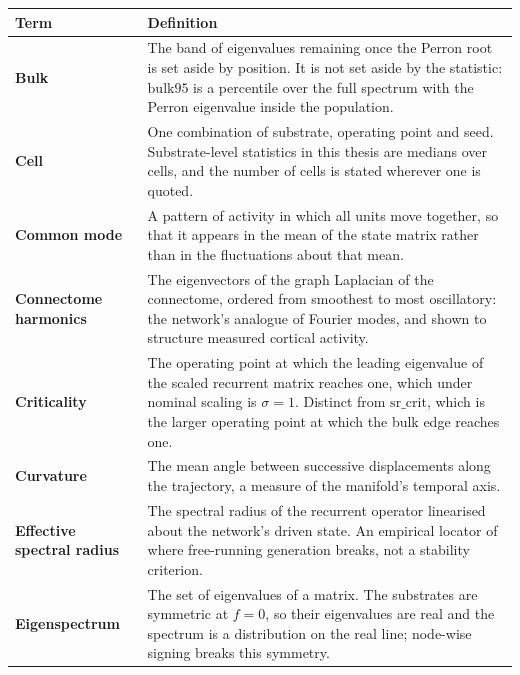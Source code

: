 \begin{longtable}{>{\raggedright\arraybackslash}p{3.4cm}p{\dimexpr\linewidth-3.4cm-4\tabcolsep\relax}}
    \toprule
    Term & Definition \\
    \midrule\endhead %

    \textbf{Bulk} & The band of eigenvalues remaining once the Perron root is set aside by position. It is not set aside by the statistic: $\mathrm{bulk95}$ is a percentile over the full spectrum with the Perron eigenvalue inside the population. \\

    \textbf{Cell} & One combination of substrate, operating point and seed. Substrate-level statistics in this thesis are medians over cells, and the number of cells is stated wherever one is quoted. \\

    \textbf{Common mode} & A pattern of activity in which all units move together, so that it appears in the mean of the state matrix rather than in the fluctuations about that mean. \\

    \textbf{Connectome harmonics} & The eigenvectors of the graph Laplacian of the connectome, ordered from smoothest to most oscillatory: the network's analogue of Fourier modes, and shown to structure measured cortical activity. \\

    \textbf{Criticality} & The operating point at which the leading eigenvalue of the scaled recurrent matrix reaches one, which under nominal scaling is $\sigma = 1$. Distinct from $\mathrm{sr\_crit}$, which is the larger operating point at which the bulk edge reaches one. \\

    \textbf{Curvature} & The mean angle between successive displacements along the trajectory, a measure of the manifold's temporal axis. \\

    \textbf{Effective spectral radius} & The spectral radius of the recurrent operator linearised about the network's driven state. An empirical locator of where free-running generation breaks, not a stability criterion. \\

    \textbf{Eigenspectrum} & The set of eigenvalues of a matrix. The substrates are symmetric at $f = 0$, so their eigenvalues are real and the spectrum is a distribution on the real line; node-wise signing breaks this symmetry. \\


\end{longtable}
